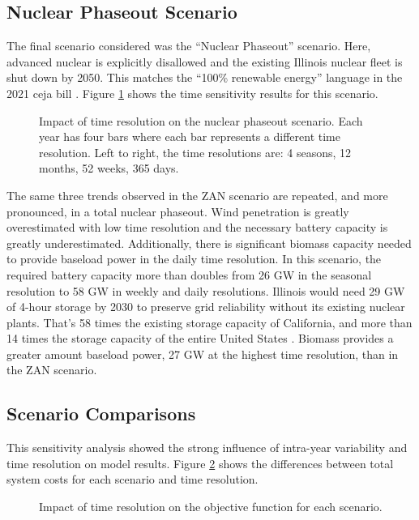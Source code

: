 \subsection{Nuclear Phaseout Scenario}
The final scenario considered was the ``Nuclear Phaseout'' scenario. Here, advanced
nuclear is explicitly disallowed and the existing Illinois nuclear fleet is shut down by
2050. This matches the ``100\% renewable energy'' language in the 2021 \gls{ceja} bill
\cite{harmon_climate_2021}. Figure \ref{fig:time_res_ZN} shows the time sensitivity
results for this scenario.

\begin{figure}[H]
  \centering
  \resizebox{0.95\columnwidth}{!}{}
  \caption{Impact of time resolution on the nuclear phaseout scenario.  Each
  year has four bars where each bar represents a different time resolution.
  Left to right, the time resolutions are: 4 seasons, 12 months, 52 weeks, 365 days.}
  \label{fig:time_res_ZN}
\end{figure}

The same three trends observed in the ZAN scenario are repeated, and
more pronounced, in a total nuclear phaseout. Wind penetration is greatly overestimated
with low time resolution and the necessary battery capacity is greatly underestimated.
Additionally, there is significant biomass capacity needed to provide baseload
power in the daily time resolution.
In this scenario, the required battery capacity more than doubles from 26 GW in the
seasonal resolution to 58 GW in weekly and daily resolutions. Illinois would need 29 GW of 4-hour
storage by 2030 to preserve grid reliability without its existing nuclear plants.
That's 58 times the existing storage capacity of California, and more than
14 times the storage capacity of the entire United States
\cite{hutchins_us_2021}.
Biomass provides a greater amount baseload power, 27 GW at the highest time resolution,
than in the ZAN scenario.

\subsection{Scenario Comparisons}
This sensitivity analysis showed the strong influence of intra-year variability
and time resolution on model results.
Figure \ref{fig:time_res_cost} shows the differences between total system costs
for each scenario and time resolution.


\begin{figure}[H]
  \centering
  \resizebox{0.75\columnwidth}{!}{}
  \caption{Impact of time resolution on the objective function for each scenario.}
  \label{fig:time_res_cost}
\end{figure}

